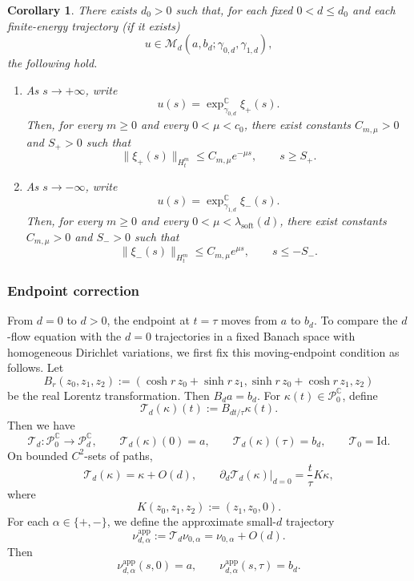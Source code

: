 \documentclass[11pt]{amsart}
\theoremstyle{plain}
\newtheorem{cor}[thm]{Corollary}
\theoremstyle{definition}
\newcommand{\C}{\mathbb{C}}
\newcommand{\PP}{\mathcal{P}}
\begin{document}
\begin{cor}\label{cor:fixed-d-exp-convergence}
There exists $d_0>0$ such that, for each fixed
$0<d\le d_0$ and each finite-energy trajectory (if it exists)
\[
u\in \mathcal M_d(a,b_d;\gamma_{0,d},\gamma_{1,d}),
\]
the following hold.

\begin{enumerate}
\item[(i)] As $s\to+\infty$, write
\[
u(s)=\exp_{\gamma_{0,d}}^{\C}\xi_+(s).
\]
Then, for every $m\ge0$ and every $0<\mu<c_0$, there exist
constants $C_{m,\mu}>0$ and $S_+>0$ such that
\[
\|\xi_+(s)\|_{H^m_t}\le C_{m,\mu}e^{-\mu s},\qquad s\ge S_+.
\]
\item[(ii)] As $s\to-\infty$, write
\[
u(s)=\exp_{\gamma_{1,d}}^{\C}\xi_-(s).
\]
Then, for every $m\ge0$ and every
$
0<\mu<\lambda_{\mathrm{soft}}(d)
$, there exist constants $C_{m,\mu}>0$ and $S_->0$ such that
\[
\|\xi_-(s)\|_{H^m_t}\le C_{m,\mu}e^{\mu s},
\qquad s\le -S_-.
\]
\end{enumerate}
\end{cor}



\subsubsection{Endpoint correction}

From $d=0$ to $d>0$, the endpoint at $t=\tau$ moves from $a$ to $b_d$.  To compare the $d$-flow equation with the $d=0$ trajectories in a fixed Banach space with homogeneous Dirichlet variations, we first fix this moving-endpoint
condition as follows.  Let
\[
B_r(z_0,z_1,z_2)
:=(\cosh r\,z_0+\sinh r\,z_1,
\sinh r\,z_0+\cosh r\,z_1,z_2)
\]
be the real Lorentz transformation. Then 
$B_d a=b_d$. For $\kappa(t)\in\PP_0^{\C}$, define
\begin{equation}\label{eq:Tkappa}
\mathcal T_d(\kappa)(t):=B_{dt/\tau}\kappa(t).
\end{equation}
Then we have
\[
\mathcal T_d:\mathcal P^{\C}_0\longrightarrow\mathcal P^{\C}_d,
\qquad\mathcal T_d(\kappa)(0)=a,
\qquad\mathcal T_d(\kappa)(\tau)=b_d,
\qquad\mathcal T_0=\mathrm{Id}.
\]
On bounded $C^2$-sets of paths,
\[
 \mathcal T_d(\kappa)=\kappa+O(d),
\qquad\partial_d\mathcal T_d(\kappa)\big|_{d=0}
=\frac{t}{\tau}K\kappa,
\]
where
\[
K(z_0,z_1,z_2):=(z_1,z_0,0).
\]
For each $\alpha\in\{+,-\}$, we define the approximate small-$d$ trajectory
\[
\nu^{\mathrm{app}}_{d,\alpha}
:=\mathcal T_d\nu_{0,\alpha}=\nu_{0,\alpha}+O(d).
\]
Then
\[\nu^{\mathrm{app}}_{d,\alpha}(s,0)=a,\qquad \nu^{\mathrm{app}}_{d,\alpha}(s,\tau)=b_d.\]
\end{document}
